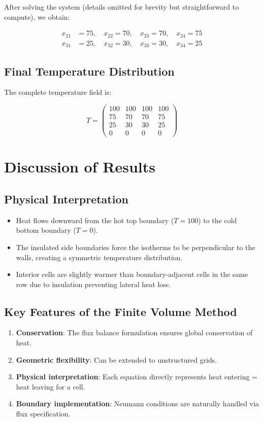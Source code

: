\documentclass{article}
\begin{document}
After solving the system (details omitted for brevity but straightforward to compute), we obtain:

\[
\begin{aligned}
x_{21} &= 75, \quad x_{22} = 70, \quad x_{23} = 70, \quad x_{24} = 75 \\
x_{31} &= 25, \quad x_{32} = 30, \quad x_{33} = 30, \quad x_{34} = 25
\end{aligned}
\]

\subsection{Final Temperature Distribution}

The complete temperature field is:

\[
T = \begin{pmatrix}
100 & 100 & 100 & 100 \\
75  & 70  & 70  & 75  \\
25  & 30  & 30  & 25  \\
0   & 0   & 0   & 0
\end{pmatrix}
\]

\section{Discussion of Results}

\subsection{Physical Interpretation}
\begin{itemize}
    \item Heat flows downward from the hot top boundary ($T=100$) to the cold bottom boundary ($T=0$).
    \item The insulated side boundaries force the isotherms to be perpendicular to the walls, creating a symmetric temperature distribution.
    \item Interior cells are slightly warmer than boundary-adjacent cells in the same row due to insulation preventing lateral heat loss.
\end{itemize}

\subsection{Key Features of the Finite Volume Method}
\begin{enumerate}
    \item \textbf{Conservation}: The flux balance formulation ensures global conservation of heat.
    \item \textbf{Geometric flexibility}: Can be extended to unstructured grids.
    \item \textbf{Physical interpretation}: Each equation directly represents heat entering = heat leaving for a cell.
    \item \textbf{Boundary implementation}: Neumann conditions are naturally handled via flux specification.
\end{enumerate}
\end{document}

